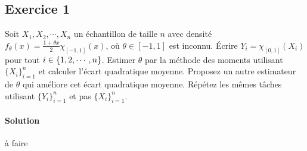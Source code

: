\documentclass[../main.tex]{subfiles}
\begin{document}
\begin{CJK*}{UTF8}{gbsn}

\section*{Exercice 1}

Soit $X_1, X_2, \cdots, X_n$ un échantillon de taille $n$ avec densité 
$f_{\theta}(x) = \frac{1 + \theta x}{2} \chi_{[-1,1]}(x)$, 
où $\theta \in [-1,1]$ est inconnu. Écrire $Y_i = \chi_{[0,1]}(X_i)$
pour tout $i \in \left \{  1, 2, \cdots, n \right \}$.
Estimer $\theta$ par la méthode des moments utilisant $\{X_i\}_{i=1}^n$ et 
calculer l'écart quadratique moyenne. 
Proposez un autre estimateur de $\theta$ qui améliore cet écart quadratique moyenne.
Répétez les mêmes tâches utilisant $\{Y_i\}_{i=1}^n$ et pas $\{X_i\}_{i=1}^n$.

\paragraph{Solution}
à faire

\end{CJK*}
\end{document}
